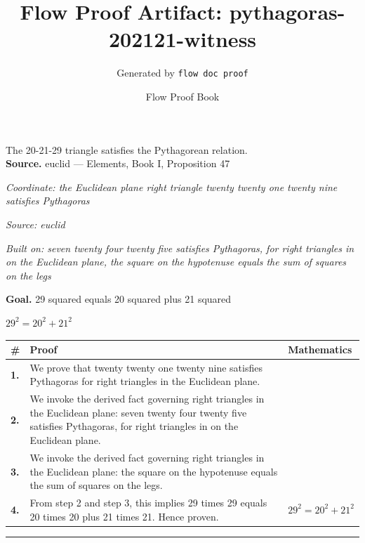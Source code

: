 \documentclass[11pt]{article}
\title{Flow Proof Artifact: pythagoras-202121-witness}
\author{Generated by \texttt{flow doc proof}}
\date{Flow Proof Book}
\theoremstyle{definition}
\begin{document}
\maketitle
The 20-21-29 triangle satisfies the Pythagorean relation.\\[0.5em]
\textbf{Source.} euclid — Elements, Book I, Proposition 47\\[0.5em]
\bigskip
{}\par
\smallskip\noindent\textit{Coordinate: the Euclidean plane \cdot right triangle \cdot twenty twenty one twenty nine satisfies Pythagoras}\par
\smallskip\noindent\textit{Source: euclid}\par
\smallskip\noindent\textit{Built on: seven twenty four twenty five satisfies Pythagoras, for right triangles in on the Euclidean plane, the square on the hypotenuse equals the sum of squares on the legs}\par
\medskip
\noindent\textbf{Goal.} 29 squared equals 20 squared plus 21 squared\par
\noindent$\displaystyle 29^{2} = 20^{2} + 21^{2}$\par
\medskip
\noindent
\begin{tabular}{@{} >{\raggedright\arraybackslash}p{} >{\raggedright\arraybackslash}p{} >{\raggedleft\arraybackslash}p{} @{}}
\textbf{\#} & \textbf{Proof} & \textbf{Mathematics} \\
\midrule
\textbf{1.} & We prove that twenty twenty one twenty nine satisfies Pythagoras for right triangles in the Euclidean plane. & \\[0.45em]
\textbf{2.} & We invoke the derived fact governing right triangles in the Euclidean plane: seven twenty four twenty five satisfies Pythagoras, for right triangles in on the Euclidean plane. & \\[0.45em]
\textbf{3.} & We invoke the derived fact governing right triangles in the Euclidean plane: the square on the hypotenuse equals the sum of squares on the legs. & \\[0.45em]
\textbf{4.} & From step 2 and step 3, this implies 29 times 29 equals 20 times 20 plus 21 times 21. Hence proven. & $\displaystyle 29^{2} = 20^{2} + 21^{2}$ \\[0.45em]
\bottomrule
\end{tabular}
\label{thm:Geometry-right triangle-twenty_twenty_one_twenty_nine_satisfies_pythagoras}
\par\medskip\hrule
\end{document}
